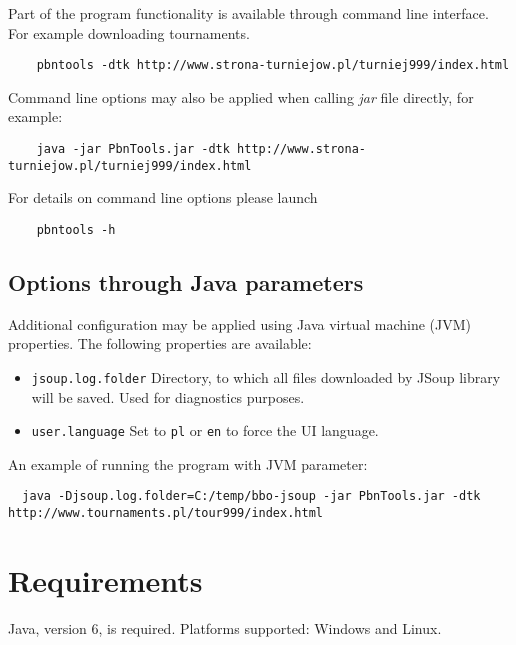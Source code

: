 \documentclass[polish,a4paper,11pt,oneside]{article}
\begin{document}
Part of the program functionality is available through command line
interface. For example downloading tournaments.

\begin{verbatim}
    pbntools -dtk http://www.strona-turniejow.pl/turniej999/index.html
\end{verbatim}

Command line options may also be applied when calling {\em jar} file
directly, for example:

\begin{verbatim}
    java -jar PbnTools.jar -dtk http://www.strona-turniejow.pl/turniej999/index.html
\end{verbatim}

For details on command line options please launch

\begin{verbatim}
    pbntools -h
\end{verbatim}

\subsection{Options through Java parameters}

Additional configuration may be applied using
Java virtual machine (JVM) properties.
The following properties are available:

\begin{itemize}
\item \verb!jsoup.log.folder! Directory, to which all files
  downloaded by JSoup library will be saved.
  Used for diagnostics purposes.
\item \verb!user.language! Set to \verb!pl! or \verb!en! to force the UI language.
\end{itemize}

An example of running the program with JVM parameter:

\begin{verbatim}
  java -Djsoup.log.folder=C:/temp/bbo-jsoup -jar PbnTools.jar -dtk http://www.tournaments.pl/tour999/index.html
\end{verbatim}



\section{Requirements}

Java, version 6, is required. Platforms supported: Windows and Linux.
\end{document}
